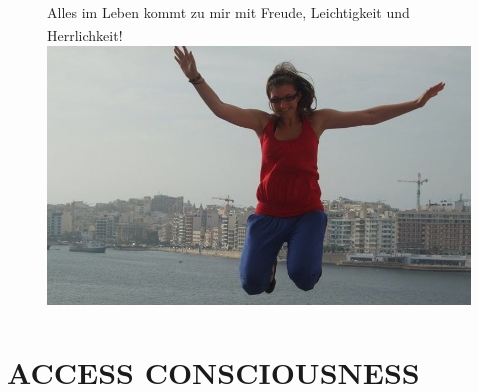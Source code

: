 \documentclass[10pt,foldmark,notumble]{leaflet}
\begin{document}
\vspace*{20mm}
\begin{figure}[h!]
 { \large Alles im Leben kommt zu mir mit Freude, Leichtigkeit und Herrlichkeit!\textsuperscript{\textregistered}} 
\includegraphics [scale=.489, angle=270 ]{Bild3.jpg}
\end{figure}





\newpage
\section{ACCESS CONSCIOUSNESS \textsuperscript{\textregistered}}
\end{document}

